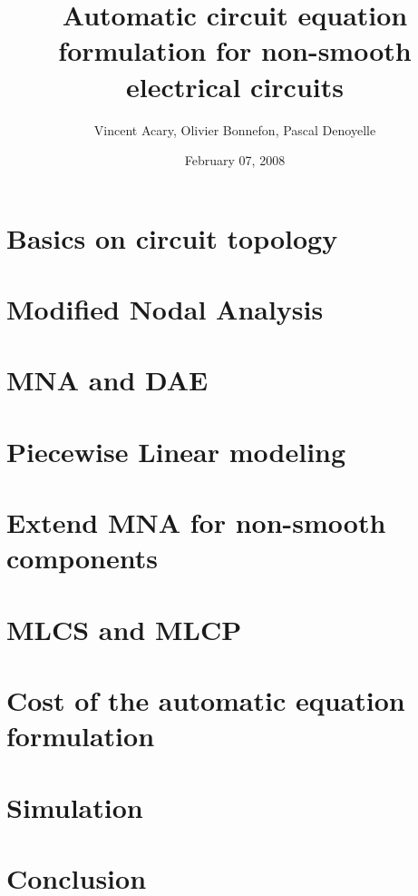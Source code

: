 \documentclass[8pt,xcolor*pst]{beamer}
\title{Automatic circuit equation formulation for non-smooth electrical circuits}
\author{Vincent Acary, Olivier Bonnefon, Pascal Denoyelle}
\date{February 07, 2008}
\institute{INRIA Rh\^one-Alpes}
\begin{document}
\frame{\titlepage}
\frame{\tableofcontents}%
\section{Basics on circuit topology}

\section{Modified Nodal Analysis}

\section{MNA and DAE}

\section{Piecewise Linear modeling}

\section{Extend MNA for non-smooth components}

\section{MLCS and MLCP}

\section{Cost of the automatic equation formulation}

\section{Simulation}

\section{Conclusion}



\def\newblock{}
\end{document}
